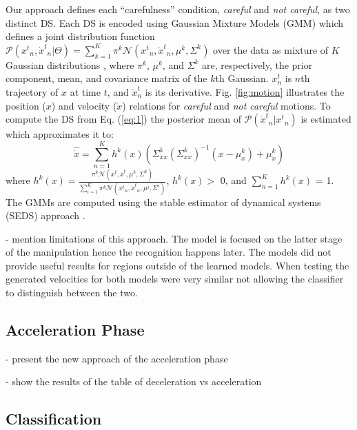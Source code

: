 Our approach defines each ``carefulness'' condition, \textit{careful} and \textit{not careful}, as two distinct DS. Each DS is encoded using Gaussian Mixture Models (GMM) which defines a joint distribution function $\mathcal{P}({{x}^{t}}_n, {\dot{x}^{t}}_n | \Theta) = \sum_{k=1}^{K} \pi^{k} \mathcal{N}({{x}^{t}}_n, {\dot{x}^{t}}_n, \mu^{k}, \Sigma^{k})$ over the data as mixture of $K$ Gaussian distributions \cite{khansari2011learning}, where $\pi^{k}$, $\mu^{k}$, and $\Sigma^{k}$ are, respectively, the prior component, mean, and covariance matrix of the $k$th Gaussian. $x_n^t$ is $n$th trajectory of $x$ at time $t$, and $\dot{x}_n^t$ is its derivative. Fig. \ref{fig:motion} illustrates the position ($x$) and velocity ($\dot{x}$) relations for \textit{careful} and \textit{not careful} motions. To compute the DS from Eq. (\ref{eq:1}) the posterior mean of $\mathcal{P}({\dot{x}^{t}}_n|{{x}^{t}}_n)$ is estimated which approximates it to:
%
\begin{equation}
\hat{\dot{x}} = \sum_{n=1}^{K} h^{k}(x) (\Sigma^{k}_{\dot{x}x}(\Sigma^{k}_{xx})^{-1} (x - \mu^{k}_{x}) + \mu^{k}_{\dot{x}})
\label{eq:2}
\end{equation}
where $h^{k}(x) = \frac{\pi^{k} \mathcal{N}({{x}^{t}}, {\dot{x}^{t}}, \mu^{k}, \Sigma^{k})}{\sum_{i=1}^{K} \pi^{k} \mathcal{N}({{x}^{t}}_n, {\dot{x}^{t}}_n, \mu^{i}, \Sigma^{i})}$, $h^{k}(x) > $ 0, and $\sum_{n=1}^{K} h^{k}(x)$ = 1. The GMMs are computed using the stable estimator of dynamical systems (SEDS) approach \cite{khansari2011learning}. 

- mention limitations of this approach. The model is focused on the latter stage of the manipulation hence the recognition happens later. The models did not provide useful results for regions outside of the learned models. When testing the generated velocities for both models were very similar not allowing the classifier to distinguish between the two. 

\subsection{Acceleration Phase}

- present the new approach of the acceleration phase

- show the results of the table of deceleration vs acceleration

\subsection{Classification}


